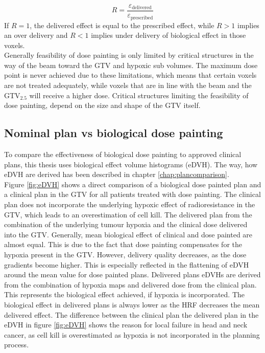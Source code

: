 \begin{equation}
R = \frac{\varepsilon_\mathrm{delivered}}{\varepsilon_\mathrm{prescribed}}
\end{equation}
If $R=1$, the delivered effect is equal to the prescribed effect, while $R>1$ implies an over delivery and $R<1$ implies under delivery of biological effect in those voxels.\\Generally feasibility of dose painting is only limited by critical structures in the way of the beam toward the GTV and hypoxic sub volumes. The maximum dose point is never achieved due to these limitations, which means that certain voxels are not treated adequately, while voxels that are in line with the beam and the GTV$_{2.5}$ will receive a higher dose. Critical structures limiting the feasibility of dose painting, depend on the size and shape of the GTV itself.
\subsection{Nominal plan vs biological dose painting}
To compare the effectiveness of biological dose painting to approved clinical plans, this thesis uses biological effect volume histograms (eDVH). The way, how eDVH are derived has been described in chapter \ref{chap:plancomparison}.\\Figure \ref{fig:eDVH} shows a direct comparison of a biological dose painted plan and a clinical plan in the GTV for all patients treated with dose painting. The clinical plan does not incorporate the underlying hypoxic effect of radioresistance in the GTV, which leads to an overestimation of cell kill. The delivered plan from the combination of the underlying tumour hypoxia and the clinical dose delivered into the GTV. Generally, mean biological effect of clinical and dose painted are almost equal. This is due to the fact that dose painting compensates for the hypoxia present in the GTV. However, delivery quality decreases, as the dose gradients become higher. This is especially reflected in the flattening of eDVH around the mean value for dose painted plans. Delivered plans eDVHs are derived from the combination of hypoxia maps and delivered dose from the clinical plan. This represents the biological effect achieved, if hypoxia is incorporated. The biological effect in delivered plans is always lower as the HRF decreases the mean delivered effect. The difference between the clinical plan the delivered plan in the eDVH in figure \ref{fig:eDVH} shows the reason for local failure in head and neck cancer, as cell kill is overestimated as hypoxia is not incorporated in the planning process.
\begin{sidewaysfigure}[p]
\centering
{}
\caption{eDVH of GTV for all treated patients with biological dose painting. The biological effect of the delivered plan (blue) reduced through hypoxia is based on the clinical plan (green). Dose painting (red) is able to compensate for hypoxia by increasing the dose to such volumes. The dip in the eDVH for the delivered plan (blue) stems from the 2.5 mmHg hypoxia level.}
\label{fig:eDVH}
\end{sidewaysfigure}
